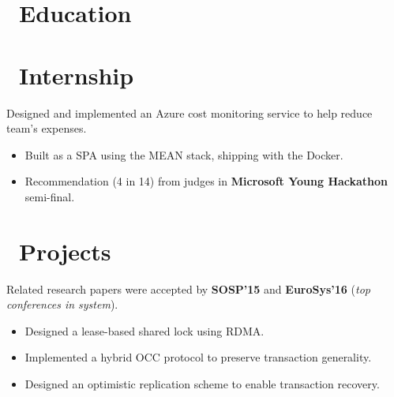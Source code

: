 \documentclass{resume}
\begin{document}



\section{\faGraduationCap\ Education}

\section{\faBriefcase\ Internship}
Designed and implemented an Azure cost monitoring service to help reduce team's expenses.
\begin{itemize}[leftmargin=*]
  \item {Built as a SPA using the MEAN stack, shipping with the Docker.}
  \item {Recommendation (4 in 14) from judges in \textbf{Microsoft Young Hackathon} semi-final.}
\end{itemize}


\section{\faUsers\ Projects}
Related research papers were accepted by \textbf{SOSP’15} and \textbf{EuroSys’16} (\emph{top conferences in system}).
\begin{itemize}[leftmargin=*]
  \item {Designed a lease-based shared lock using RDMA.}
  \item {Implemented a hybrid OCC protocol to preserve transaction generality.}
  \item {Designed an optimistic replication scheme to enable transaction recovery.}
\end{itemize}
\end{document}
